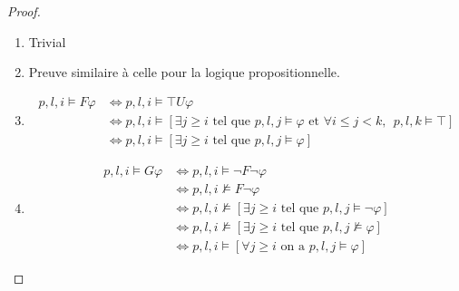 \documentclass[12pt,a4paper]{article}
\theoremstyle{plain}
\theoremstyle{definition}
\begin{document}
\begin{proof}
	\leavevmode
	\begin{enumerate}
		\item Trivial
		\item Preuve similaire à celle pour la logique propositionnelle.
		\item 
		\begin{align*}
			p,l,i \models F\varphi &\Leftrightarrow p,l,i \models \top U \varphi \\
			&\Leftrightarrow p,l,i \models [\exists j \geq i \textrm{ tel que } p,l,j \models \varphi \textrm{ et } \forall i \leq j < k, \:\: p,l,k\models \top] \\
			&\Leftrightarrow p,l,i \models [\exists j \geq i \text{ tel que } p,l,j \models \varphi]
		\end{align*}
		\item
		\begin{align*}
			p,l,i \models G \varphi &\Leftrightarrow p,l,i \models \lnot F \lnot \varphi \\
			&\Leftrightarrow p,l,i \not \models F \lnot \varphi \\
			&\Leftrightarrow p,l,i \not \models [\exists j \geq i \textrm{ tel que } p,l,j \models \lnot \varphi] \\
			&\Leftrightarrow p,l,i \not \models [\exists j \geq i \textrm{ tel que } p,l,j \not \models \varphi] \\
			&\Leftrightarrow p,l,i \models [\forall j \geq i \textrm{ on a } p,l,j \models \varphi]
		\end{align*}
	\end{enumerate}
\end{proof}
\end{document}
